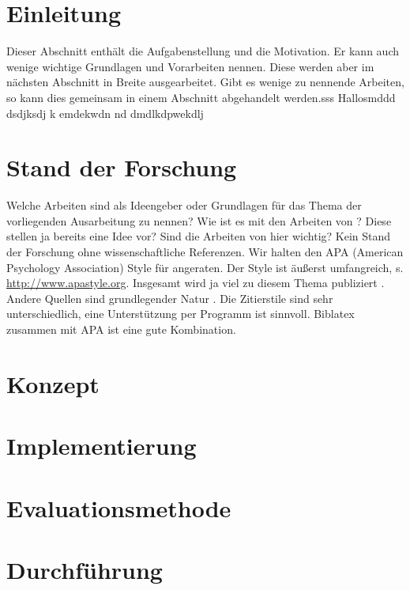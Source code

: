 \documentclass[	12pt, 
				a4paper, 
				BCOR=10mm, %
				DIV=12, 
				parskip=half, %
				headings=small, %
				twoside, %
				ngerman,
				bibliography=totoc,index=totoc, listof=totoc,
				numbers=noendperiod
				]{scrbook} %
\theoremstyle{plain}%
\theoremstyle{definition}
\theoremstyle{remark}
\begin{document}
\section{Einleitung}
\label{sec:einleitung}


Dieser Abschnitt enthält die Aufgabenstellung und die Motivation. Er kann auch
wenige wichtige Grundlagen und Vorarbeiten nennen. Diese werden aber im nächsten Abschnitt in Breite ausgearbeitet. Gibt es wenige zu nennende Arbeiten, so kann dies gemeinsam in einem Abschnitt abgehandelt werden.sss Hallosmddd dsdjksdj k emdekwdn nd dmdlkdpwekdlj 

\section{Stand der Forschung}
\label{sec:forschungsstand}
Welche Arbeiten sind als Ideengeber oder Grundlagen für das Thema der vorliegenden Ausarbeitung zu nennen? Wie ist es mit den Arbeiten von \textcite{fischbach:2012a}? Diese stellen ja bereits eine Idee vor? Sind die Arbeiten von \textcite{fischbach:2012a} hier wichtig? Kein Stand der Forschung ohne wissenschaftliche Referenzen. Wir halten den APA (American Psychology Association) Style für angeraten. Der Style ist äußerst umfangreich, s. \url{http://www.apastyle.org}. Insgesamt wird ja viel zu diesem Thema publiziert \parencite{wiebusch:2012a}. Andere Quellen sind grundlegender Natur \parencites{latoschik:2012a,latoschik:2011,fischbach:2011,Rehfeld:2010,wiebusch:2010,latoschik:2010}. Die Zitierstile sind sehr unterschiedlich, eine Unterstützung per Programm ist sinnvoll. Biblatex zusammen mit APA ist eine gute Kombination. 

\section{Konzept}
\label{sec:konzept}
\section{Implementierung}
\label{sec:implementierung}
\section{Evaluationsmethode}
\label{sec:evaluationsmethode}
\section{Durchführung}
\label{sec:durchfuehrung}
\end{document}
